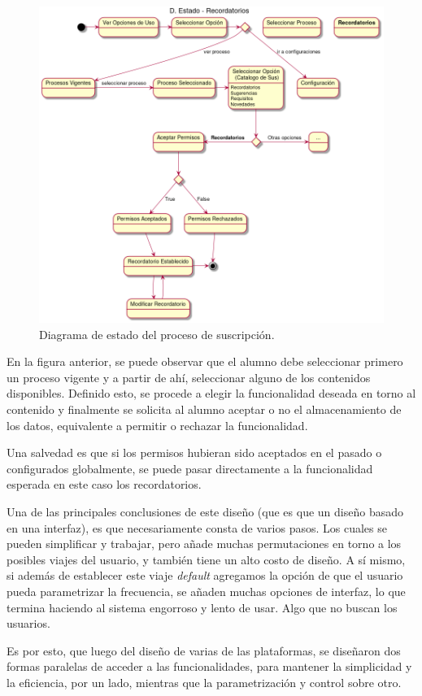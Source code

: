         \begin{figure}[h]
            \centering
            \includegraphics[width=\textwidth]{media/diagramas/estados/3-E-Recordatorios.png}
            \caption[Diagrama de estados]{Diagrama de estado del proceso de suscripción.}
        \end{figure}
            

    \par En la figura anterior, se puede observar que el alumno debe seleccionar primero un proceso vigente y a partir de ahí, seleccionar alguno de los contenidos disponibles. Definido esto, se procede a elegir la funcionalidad deseada en torno al contenido y finalmente se solicita al alumno aceptar o no el almacenamiento de los datos, equivalente a permitir o rechazar la funcionalidad. 
    \par Una salvedad es que si los permisos hubieran sido aceptados en el pasado o configurados globalmente, se puede pasar directamente a la funcionalidad esperada en este caso los recordatorios.
    \par Una de las principales conclusiones de este diseño (que es que un diseño basado en una interfaz), es que necesariamente consta de varios pasos. Los cuales se pueden simplificar y trabajar, pero añade muchas permutaciones en torno a los posibles viajes del usuario, y también tiene un alto costo de diseño. A sí mismo, si además de establecer este viaje \textit{default} agregamos la opción de que el usuario pueda parametrizar la frecuencia, se añaden muchas opciones de interfaz, lo que termina haciendo al sistema engorroso y lento de usar. Algo que no buscan los usuarios.
    \par Es por esto, que luego del diseño de varias de las plataformas, se diseñaron dos formas paralelas de acceder a las funcionalidades, para mantener la simplicidad y la eficiencia, por un lado, mientras que la parametrización y control sobre otro.

